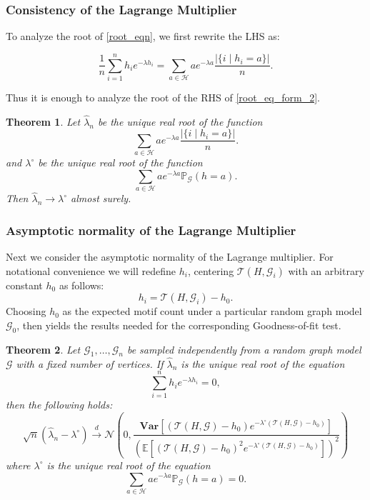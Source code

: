 \documentclass[12pt]{article}
\numberwithin{equation}{section}
\newtheorem{theorem}{Theorem}[section]
\begin{document}
\subsubsection{Consistency of the Lagrange Multiplier}

 To analyze the root of \eqref{root_eqn}, we first rewrite the LHS as:

\begin{equation}\frac{1}{n}\sum_{i=1}^n h_{i} e^{-\lambda h_{i}}=\sum_{a\in \mathcal{H}} a e^{-\lambda a}\frac{\lvert\{i\mid h_i=a\}\rvert}{n}\label{root_eq_form_2}.\end{equation}

Thus it is enough to analyze the root of the RHS of \eqref{root_eq_form_2}.

\begin{theorem}{\label{finite_consistency}}
Let  $\hat{\lambda}_n$ be the unique real root of the function
\[
\sum_{a\in \mathcal{H}} a e^{-\lambda a}\frac{\lvert\{i\mid h_i=a\}\rvert}{n}.
\] 
and $\lambda^{\circ}$ be the unique real root of the function 
\[\sum_{a\in \mathcal{H}}a e^{-\lambda a}\mathbb{P}_{\mathcal{G}}(h=a).\]
Then $\hat{\lambda}_n\rightarrow \lambda^{\circ}$ almost surely.
\end{theorem}

\subsubsection{Asymptotic normality of the Lagrange Multiplier}

Next we consider the asymptotic normality of the Lagrange multiplier. For notational convenience we will redefine $h_i$, centering $\mathcal{T}(H,\mathcal{G}_i)$ with an arbitrary constant $h_0$ as follows:
$$h_{i}=\mathcal{T}(H,\mathcal{G}_{i})-h_0.$$
Choosing $h_0$ as the expected motif count under a particular random graph model $\mathcal G_0$, then yields the results needed for the corresponding Goodness-of-fit test.

\begin{theorem}{\label{finite_an}}
Let $\mathcal{G}_{1}, \ldots, \mathcal{G}_{n}$ be sampled independently from a random graph model $\mathcal{G}$ with a fixed number of vertices.
If $\hat{\lambda}_n$ is the unique real root of the equation
\[
\sum_{i=1}^n h_{i} e^{-\lambda h_{i}} = 0,
\]
then the following holds: 
\[\sqrt{n}(\hat{\lambda}_n - \lambda^{\circ})\xrightarrow{{d}}\mathcal{N}\left(0, \frac{\mathbf{Var}\left[(\mathcal{T}(H,\mathcal{G})-h_0)e^{-\lambda^{\circ}(\mathcal{T}(H,\mathcal{G})-h_0)}\right]}{(\mathbb{E}\left[(\mathcal{T}(H,\mathcal{G})-h_0)^2e^{-\lambda^{\circ}(\mathcal{T}(H,\mathcal{G})-h_0)}\right])^2}\right)
\]
where  $\lambda^{\circ}$ is the unique real root of the equation \[\sum_{a\in \mathcal{H}} a e^{-\lambda a}\mathbb{P}_{\mathcal{G}}(h=a) = 0.\]
\end{theorem}
\end{document}
